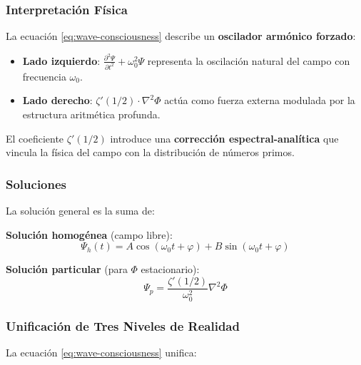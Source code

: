 \subsubsection{Interpretación Física}

La ecuación \eqref{eq:wave-consciousness} describe un \textbf{oscilador armónico forzado}:

\begin{itemize}
  \item \textbf{Lado izquierdo}: $\frac{\partial^2 \Psi}{\partial t^2} + \omega_0^2 \Psi$ representa la oscilación natural del campo con frecuencia $\omega_0$.
  \item \textbf{Lado derecho}: $\zeta'(1/2) \cdot \nabla^2 \Phi$ actúa como fuerza externa modulada por la estructura aritmética profunda.
\end{itemize}

El coeficiente $\zeta'(1/2)$ introduce una \textbf{corrección espectral-analítica} que vincula la física del campo con la distribución de números primos.

\subsubsection{Soluciones}

La solución general es la suma de:

\textbf{Solución homogénea} (campo libre):
\begin{equation}
\Psi_h(t) = A \cos(\omega_0 t + \varphi) + B \sin(\omega_0 t + \varphi)
\end{equation}

\textbf{Solución particular} (para $\Phi$ estacionario):
\begin{equation}
\Psi_p = \frac{\zeta'(1/2)}{\omega_0^2} \nabla^2 \Phi
\end{equation}

\subsubsection{Unificación de Tres Niveles de Realidad}

La ecuación \eqref{eq:wave-consciousness} unifica:

